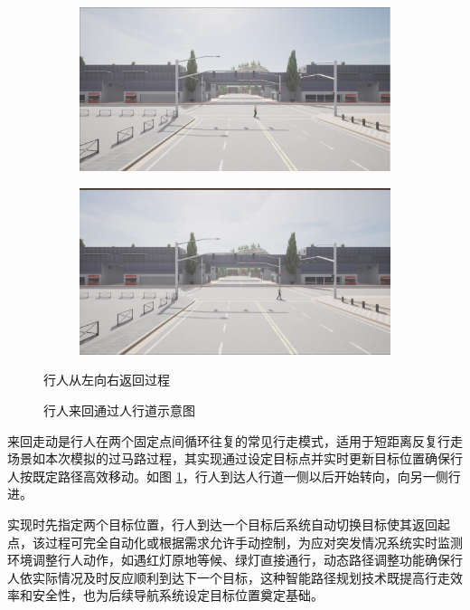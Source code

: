 \begin{figure}[H]
\begin{minipage}{\textwidth}
        \begin{subfigure}{0.48\textwidth}
            \includegraphics[width=\textwidth]{images/crossing_walking7.pdf}
        \end{subfigure}
        \begin{subfigure}{0.48\textwidth}
            \includegraphics[width=\textwidth]{images/crossing_walking8.pdf}
        \end{subfigure}

        \caption*{行人从左向右返回过程}
    \end{minipage}

    \vspace{0.5cm}
    
    \caption{行人来回通过人行道示意图}
    \label{fig:walking_back_and_forth}
\end{figure}

来回走动是行人在两个固定点间循环往复的常见行走模式，适用于短距离反复行走场景如本次模拟的过马路过程，其实现通过设定目标点并实时更新目标位置确保行人按既定路径高效移动。如图 \ref{fig:walking_back_and_forth}，行人到达人行道一侧以后开始转向，向另一侧行进。

实现时先指定两个目标位置，行人到达一个目标后系统自动切换目标使其返回起点，该过程可完全自动化或根据需求允许手动控制，为应对突发情况系统实时监测环境调整行人动作，如遇红灯原地等候、绿灯直接通行，动态路径调整功能确保行人依实际情况及时反应顺利到达下一个目标，这种智能路径规划技术既提高行走效率和安全性，也为后续导航系统设定目标位置奠定基础。

